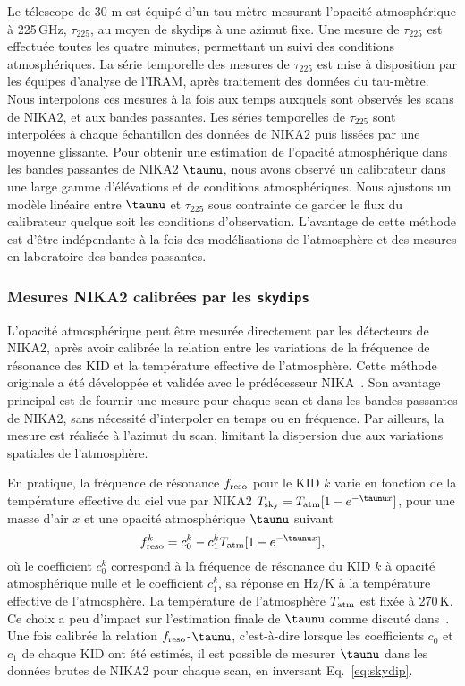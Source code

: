 Le télescope de 30-m est équipé d'un tau-mètre mesurant l'opacité
atmosphérique à 225\,GHz, $\tau_{225}$, au moyen de skydips à une
azimut fixe. Une mesure de $\tau_{225}$ est effectuée toutes les
quatre minutes, permettant un suivi des conditions atmosphériques. La
série temporelle des mesures de $\tau_{225}$ est mise à disposition
par les équipes d'analyse de l'IRAM, après traitement des données du
tau-mètre. Nous interpolons ces mesures à la fois aux temps auxquels
sont observés les scans de NIKA2, et aux bandes passantes. Les séries
temporelles de $\tau_{225}$ sont interpolées à chaque échantillon des
données de NIKA2 puis lissées par une moyenne glissante. Pour obtenir
une estimation de l'opacité atmosphérique dans les bandes passantes de
NIKA2 $\taunu$, nous avons observé un calibrateur dans une large
gamme d'élévations et de conditions atmosphériques. Nous ajustons un
modèle linéaire entre $\taunu$ et $\tau_{225}$ sous contrainte de
garder le flux du calibrateur quelque soit les conditions
d'observation. L'avantage de cette méthode est d'être indépendante à
la fois des modélisations de l'atmosphère et des mesures en
laboratoire des bandes passantes. 

\subsubsection{Mesures NIKA2 calibrées par les {\tt skydips}}

L'opacité atmosphérique peut être mesurée directement par les
détecteurs de NIKA2, après avoir calibrée la relation entre les
variations de la fréquence de résonance des KID et la température
effective de l'atmosphère. Cette méthode originale a été développée et
validée avec le prédécesseur NIKA~\citep{Catalano2014}. Son avantage
principal est de fournir une mesure pour chaque scan et dans les
bandes passantes de NIKA2, sans nécessité d'interpoler en temps ou en
fréquence. Par ailleurs, la mesure est réalisée à l'azimut du scan,
limitant la dispersion due aux variations spatiales de l'atmosphère.

En pratique, la fréquence de résonance $f_{\rm{reso}}$ pour le KID $k$
varie en fonction de la température effective du ciel vue par
NIKA2 $T_{\rm{sky}} = T_{\rm{atm}}[1-e^{-\taunu x}]$, pour une masse
d'air $x$ et une opacité atmosphérique $\taunu$ suivant 
%
\begin{equation}
f_{\rm{reso}}^k  = c_0^k - c_1^k T_{\rm{atm}}[1-e^{-\taunu x}],
\label{eq:skydip}
\end{equation}
%
où le coefficient $c_0^k$ correspond à la fréquence de résonance du
KID $k$ à opacité atmosphérique nulle et le coefficient $c_1^k$, sa
réponse en Hz/K à la température effective de l'atmosphère. La
température de l'atmosphère $T_{\rm{atm}}$ est fixée à
270\,K. Ce choix a peu d'impact sur l'estimation finale de $\taunu$
comme discuté dans~\citet{Perotto2019}. Une fois calibrée la relation
$f_{\rm{reso}}$-$\taunu$, c'est-à-dire lorsque les coefficients $c_0$ et
$c_1$ de chaque KID ont été estimés, il est possible de mesurer
$\taunu$ dans les données brutes de NIKA2 pour chaque scan, en
inversant Eq.~\ref{eq:skydip}.

